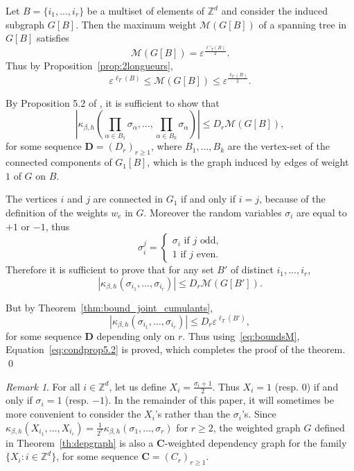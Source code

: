 \documentclass{amsart}
\newcommand{\field}[1]{\mathbb{#1}}
\newcommand{\Z}{\field{Z}}
\def\si{\sigma}
\def\WDep{G}
\def\eps{\varepsilon}
\numberwithin{equation}{section}
\theoremstyle{remark}
\newtheorem{remark}[theorem]{Remark}
\renewenvironment{proof}[1][Proof]{\begin{trivlist}
\item[\hskip \labelsep {\bfseries #1:}]}{\qed\end{trivlist}}
\begin{document}
\begin{proof}[Proof of Theorem~\ref{th:depgraph}]
Let $B = \{i_1, ..., i_r \}$ be a multiset of elements of $\Z^d$ and consider the induced subgraph $\WDep[B].$
Then the maximum weight $\mathcal{M}(\WDep[B])$ of a spanning tree in $\WDep[B]$ satisfies
$$ \mathcal{M}(\WDep[B])= \eps^{\frac{\ell'_T(B)}{2}}.$$
Thus by Proposition~\ref{prop:2longueurs},
\begin{equation}
\label{eq:boundsM}
\eps^{\ell_T(B)} \leq \mathcal{M}(\WDep[B]) \leq \eps^{\frac{\ell_T(B)}{2}}.
\end{equation} 

By Proposition 5.2 of \cite{Valentin}, it is sufficient to show that
$$\left| \kappa_{\beta,h} \left( \prod_{\alpha \in B_1} \sigma_{\alpha}, \dots, \prod_{\alpha \in B_k} \sigma_{\alpha} \right) \right| \leq D_r \mathcal{M}(\WDep[B]),$$
for some sequence $\mathbf{D}= (D_r)_{r \geq 1}$, where $B_1, \dots , B_k$ are the vertex-set of the connected components of $\WDep_1[B]$, which is the graph induced by edges of weight $1$ of $\WDep$ on $B$.

The vertices $i$ and $j$ are connected in $\WDep_1$ if and only if $i=j$, because of the definition of the weights $w_e$ in $\WDep.$ Moreover the random variables $\sigma_{i}$ are equal to $+1$ or $-1$, thus
$$\sigma_i^j = \begin{cases}
\sigma_i \text{ if $j$ odd,}\\
1 \text{ if $j$ even.}
\end{cases}$$
Therefore it is sufficient to prove that for any set $B'$ of distinct $i_1, \dots, i_r$,
\begin{equation}
\label{eq:condprop5.2}
\left| \kappa_{\beta,h} \left( \sigma_{i_1}, \dots, \sigma_{i_r} \right) \right| \leq D_r \mathcal{M}(\WDep[B']).
\end{equation}

But by Theorem~\ref{thm:bound_joint_cumulants},
$$\left| \kappa_{\beta,h} \left( \sigma_{i_1}, \dots, \sigma_{i_r} \right) \right| \leq D_r \eps^{\ell_T(B')},$$
for some sequence $\mathbf{D}$ depending only on $r$. Thus using~\eqref{eq:boundsM}, Equation~\eqref{eq:condprop5.2} is proved, which completes the proof of the theorem.
\end{proof}

\begin{remark}
For all $i \in \Z^d$, let us define $X_i = \frac{\sigma_i+1}{2}$. Thus $X_i = 1$ (resp. $0$) if and only if $\sigma_i=1$ (resp. $-1$). In the remainder of this paper, it will sometimes be more convenient to consider the $X_i$'s rather than the $\sigma_i$'s. 
Since $\kappa_{\beta,h}(X_{i_1},\dots,X_{i_r})=\tfrac{1}{2^r} \kappa_{\beta,h}(\si_1,\dots,\si_r)$ for $r\ge 2$,
the weighted graph $\WDep$ defined in Theorem~\ref{th:depgraph} is also a $\mathbf{C}$-weighted dependency graph for the family $\{X_i : i \in \Z^d \}$,
for some sequence  $\mathbf{C} = (C_r)_{r \geq 1}$.
\end{remark}
\end{document}

